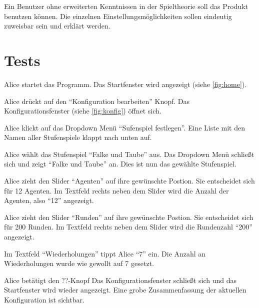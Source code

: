 \documentclass[parskip=full,11pt]{scrartcl}
\begin{document}
Ein Benutzer ohne erweiterten Kenntnissen in der Spieltheorie soll das Produkt benutzen können.
Die einzelnen Einstellungsmöglichkeiten sollen eindeutig zuweisbar sein und erklärt werden.

\section{Tests}


{Alice startet das Programm.}
{Das Startfenster wird angezeigt (siehe \cref{fig:home}).}

{Alice drückt auf den \enquote{Konfiguration bearbeiten} Knopf.}%
{Das Konfigurationsfenster (siehe \cref{fig:konfig}) öffnet sich.}

{Alice klickt auf das Dropdown Menü \enquote{Sufenspiel festlegen}.}%
{Eine Liste mit den Namen aller Stufenspiele klappt nach unten auf.}

{Alice wählt das Stufenspiel \enquote{Falke und Taube} aus.}
{Das Dropdown Menü schließt sich und zeigt \enquote{Falke und Taube} an. Dies ist nun das gewählte Stufenspiel.}

{Alice zieht den Slider \enquote{Agenten} auf ihre gewünschte Postion. Sie entscheidet sich für 12 Agenten.}%
{Im Textfeld rechts neben dem Slider wird die Anzahl der Agenten, also \enquote{12} angezeigt.}

{Alice zieht den Slider \enquote{Runden} auf ihre gewünschte Postion. Sie entscheidet sich für 200 Runden.}%
{Im Textfeld rechts neben dem Slider wird die Rundenzahl \enquote{200} angezeigt.}

{Im Textfeld \enquote{Wiederholungen} tippt Alice \enquote{7} ein.}%
{Die Anzahl an Wiederholungen wurde wie gewollt auf 7 gesetzt.}

{Alice betätigt den ??-Knopf}
{Das Konfigurationsfenster schließt sich und das Startfenster wird wieder angezeigt. Eine grobe Zusammenfassung der aktuellen Konfiguration ist sichtbar.}
\end{document}
